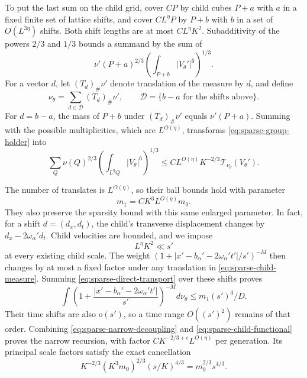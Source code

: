 To put the last sum on the child grid, cover $CP$ by child cubes $P+a$
with $a$ in a fixed finite set of lattice shifts, and cover
$CL^\eta P$ by $P+b$ with $b$ in a set of $O(L^{3\eta})$ shifts.
Both shift lengths are at most $CL^\eta K^2$.  Subadditivity of the
powers $2/3$ and $1/3$ bounds a summand by the sum of
\[
 \nu'(P+a)^{2/3}
        \left(\int_{P+b}|V_\theta'|^6\right)^{1/3}.
\]
For a vector $d$, let $(T_d)_\#\nu'$ denote translation of the measure
by $d$, and define
\begin{equation}\label{eq:sparse-child-measure}
 \nu_{\theta}
    =\sum_{d\in\mathcal D}(T_d)_\#\nu',
 \qquad
 \mathcal D=\{b-a\text{ for the shifts above}\}.
\end{equation}
For $d=b-a$, the mass of $P+b$ under $(T_d)_\#\nu'$ equals
$\nu'(P+a)$.  Summing with the possible multiplicities, which are
$L^{O(\eta)}$, transforms \eqref{eq:sparse-group-holder} into
\begin{equation}\label{eq:sparse-child-functional}
 \sum_Q\nu(Q)^{2/3}
      \left(\int_{L^\eta Q}|V_\theta|^6\right)^{1/3}
 \le C L^{O(\eta)}K^{-2/3}\mathcal T_{\nu_\theta}(V_\theta').
\end{equation}

The number of translates is $L^{O(\eta)}$, so their ball bounds hold
with parameter
\begin{equation}\label{eq:sparse-child-density}
 m_1=C K^3L^{O(\eta)}m_0.
\end{equation}
They also preserve the sparsity bound with this same enlarged
parameter.  In fact, for a shift $d=(d_x,d_t)$, the child's transverse
displacement changes by $d_x-2\omega_\alpha'd_t$.  Child velocities
are bounded, and we impose
\begin{equation}\label{eq:sparse-shift-smallness}
 L^\eta K^2\ll s'
\end{equation}
at every existing child scale.  The weight
$(1+|x'-b_\alpha'-2\omega_\alpha't'|/s')^{-M}$ then changes by at most
a fixed factor under any translation in \eqref{eq:sparse-child-measure}.
Summing \eqref{eq:sparse-direct-transport} over these shifts proves
\[
 \int\left(1+\frac{|x'-b_\alpha'-2\omega_\alpha't'|}{s'}\right)^{-M}
       d\nu_\theta
 \le m_1(s')^3/D.
\]
Their time shifts are also $o(s')$, so a time range $O((s')^2)$ remains
of that order.  Combining \eqref{eq:sparse-narrow-decoupling} and
\eqref{eq:sparse-child-functional} proves the narrow recursion, with
factor $C K^{-2/3+\epsilon}L^{O(\eta)}$ per generation.  Its principal
scale factors satisfy the exact cancellation
\begin{equation}\label{eq:sparse-scale-cancellation}
 K^{-2/3}(K^3m_0)^{2/3}(s/K)^{4/3}
       =m_0^{2/3}s^{4/3}.
\end{equation}

